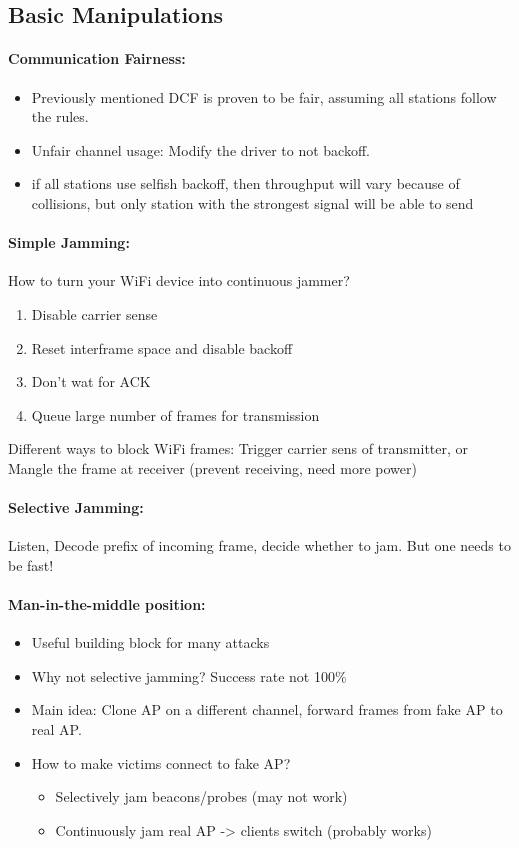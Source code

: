 \subsection{Basic Manipulations}

\paragraph{Communication Fairness:} 
\begin{itemize}
    \item Previously mentioned DCF is proven to be fair, assuming all stations follow the rules.
    \item Unfair channel usage: Modify the driver to not backoff.
    \item if all stations use selfish backoff, then throughput will vary because of collisions, but only station with the strongest signal will be able to send
\end{itemize}

\paragraph{Simple Jamming:} How to turn your WiFi device into continuous jammer?
\begin{enumerate}
    \item Disable carrier sense
    \item Reset interframe space and disable backoff
    \item Don't wat for ACK
    \item Queue large number of frames for transmission
\end{enumerate}
Different ways to block WiFi frames: Trigger carrier sens of transmitter, or Mangle the frame at receiver (prevent receiving, need more power)

\paragraph{Selective Jamming:} Listen, Decode prefix of incoming frame, decide whether to jam. But one needs to be fast!

\paragraph{Man-in-the-middle position:}
\begin{itemize}
    \item Useful building block for many attacks
    \item Why not selective jamming? Success rate not 100\%
    \item Main idea: Clone AP on a different channel, forward frames from fake AP to real AP.
    \item How to make victims connect to fake AP? 
    \begin{itemize}
        \item Selectively jam beacons/probes (may not work)
        \item Continuously jam real AP -> clients switch (probably works)
    \end{itemize}
\end{itemize}

